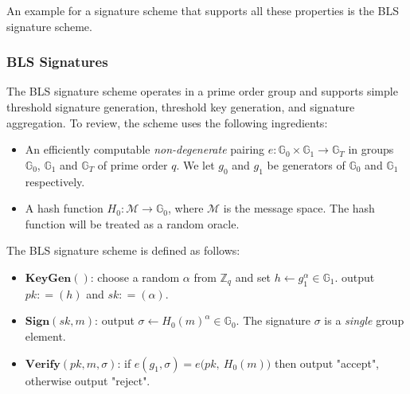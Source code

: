 An example for a signature scheme that supports all these properties is the BLS signature scheme.

\subsubsection{BLS Signatures}

The BLS signature scheme operates in a prime order group and supports simple threshold signature generation,
threshold key generation, and signature aggregation. To review, the scheme uses the following ingredients:

\newcommand{\G}{\mathbb{G}}
\newcommand{\Z}{\mathbb{Z}}
\newcommand{\adv}{{\cal A}}
\newcommand{\bdv}{{\cal B}}
\newcommand{\deq}{\mathrel{\mathop:}=}
\newcommand{\SK}{\mathit{sk}}
\newcommand{\PK}{\mathit{pk}}
\newcommand{\C}{\mathit{cert}}
\newcommand{\APK}{\mathit{apk}}
\newcommand{\DPK}{\mathit{\Delta pk}}
\newcommand{\MM}{\mathcal{M}}
\newcommand{\xwedge}{\, \operatorname{\text{$\wedge$}}\, }
\newcommand{\abs}[1]{\lvert #1 \rvert}
\newcommand{\Hm}{H_0}
\newcommand{\Hpk}{H_1}
\newcommand{\qHpk}{Q_{\Hpk}}
\newcommand{\qHm}{Q_{\Hm}}
\newcommand{\qsig}{Q_{\text{sig}}}

\begin{itemize}
    \item An efficiently computable \emph{non-degenerate} pairing $e:\G_0 \times \G_1 \to \G_T$
    in groups $\G_0$, $\G_1$ and $\G_T$ of prime order $q$. We let $g_0$ and $g_1$ be generators
    of $\G_0$ and $\G_1$ respectively.
    \item A hash function $H_0: \mathcal{M} \rightarrow \mathbb{G}_0$, where $\mathcal{M}$ is the message space.
    The hash function will be treated as a random oracle.
\end{itemize}

The BLS signature scheme is defined as follows:

\begin{itemize}
    \item $\textbf{KeyGen}()$: choose a random $\alpha$ from $\Z_q$ and set $h \gets g_1^\alpha \in \G_1$.
    output $\PK \deq (h)$ and $\SK \deq (\alpha)$.
    \item $\textbf{Sign}(\SK, m)$: output $\sigma \gets \Hm(m)^\alpha \in \G_0$.
    The signature $\sigma$ is a \emph{single} group element.
    \item $\textbf{Verify}(\PK,m,\sigma)$: if $e(g_1, \sigma) = e\big(\PK,\ \Hm(m)\big)$  then output "accept",
    otherwise output "reject".
\end{itemize}


